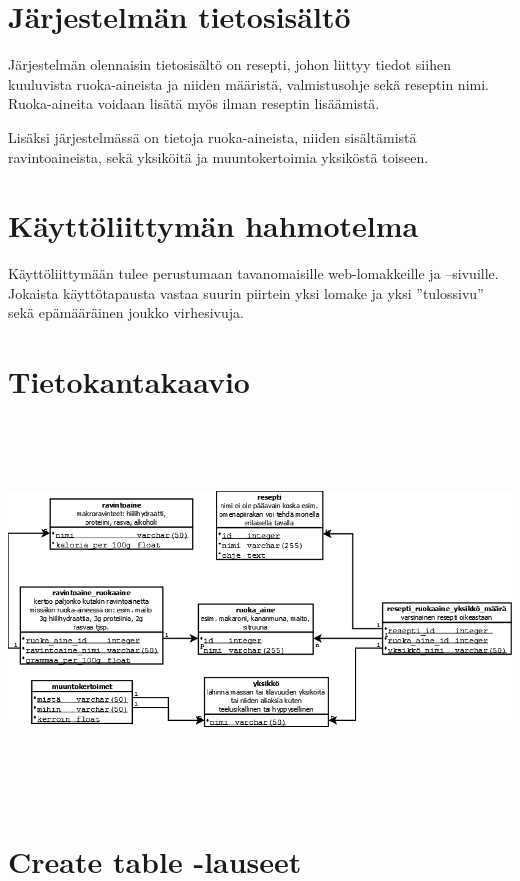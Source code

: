 \documentclass[12pt]{article}
\begin{document}
\section{Järjestelmän tietosisältö}

Järjestelmän olennaisin tietosisältö on resepti, johon liittyy tiedot siihen kuuluvista ruoka-aineista ja niiden määristä, valmistusohje sekä reseptin nimi. Ruoka-aineita voidaan lisätä myös ilman reseptin lisäämistä. 

Lisäksi järjestelmässä on tietoja ruoka-aineista, niiden sisältämistä ravintoaineista, sekä yksiköitä ja muuntokertoimia yksiköstä toiseen.



\section{Käyttöliittymän hahmotelma}

Käyttöliittymään tulee perustumaan tavanomaisille web-lomakkeille ja –sivuille. Jokaista käyttötapausta vastaa suurin piirtein yksi lomake ja yksi ”tulossivu” sekä epämääräinen joukko virhesivuja.



\appendix
\section{Tietokantakaavio}
\includegraphics[width=160mm,height=100mm]{Kaavio1.png}


\appendix
\section{Create table -lauseet}

\end{document}
